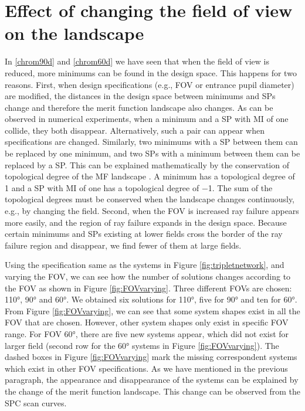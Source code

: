 \section{Effect of changing the field of view on the landscape}
In \ref{chrom90d} and \ref{chrom60d} we have seen that when the field of view is reduced, more minimums can be found in the design space. This happens for two reasons. First, when design specifications (e.g., FOV or entrance pupil diameter) are modified, the distances in the design space between minimums and SPs change
and therefore the merit function landscape also changes. As can be observed in numerical experiments, when a minimum and a SP with MI of one collide, they both disappear. Alternatively, such a pair can appear when specifications are changed. Similarly, two minimums with a SP between them can be replaced by one minimum, and two SPs with a minimum between them can be replaced by a SP. This can be explained mathematically by the conservation of topological degree of the MF landscape \cite{vanTurnhoutThesis2009}. A minimum has a topological degree of 1 and a SP with MI of one has a topological degree of −1. The sum of the topological degrees must be conserved when the landscape changes continuously, e.g., by changing the field. Second, when the FOV is increased ray failure appears more easily, and the region of ray failure expands in the design space. Because certain minimums and SPs existing at lower fields cross the border of the ray failure region and disappear, we find fewer of them at large fields.

Using the specification same as the systems in Figure \ref{fig:tripletnetwork}, and varying the FOV, we can see how the number of solutions changes according to the FOV as shown in Figure \ref{fig:FOVvarying}. Three different FOVs are chosen: 110°, 90° and 60°. We obtained six solutions for 110°, five for 90° and ten for 60°. From Figure \ref{fig:FOVvarying}, we can see that some system shapes exist in all the FOV that are chosen. However, other system shapes only exist in specific FOV range.
For FOV 60°, there are five new systems appear, which did not exist for larger field (second row for the 60° systems in Figure \ref{fig:FOVvarying}). The dashed boxes in Figure \ref{fig:FOVvarying} mark the missing correspondent systems which exist in other FOV specifications. As we have mentioned in the previous paragraph, the appearance and disappearance of the systems can be explained by the change of the merit function landscape. This change can be observed from the SPC scan curves.  


